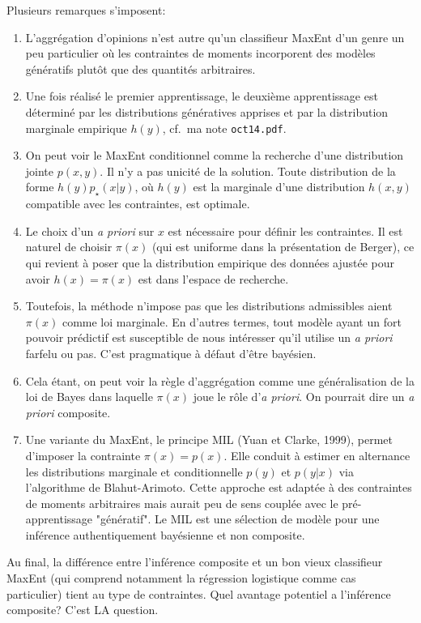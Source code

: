 \documentclass{article}
\begin{document}
Plusieurs remarques s'imposent:
\begin{enumerate}
    \item L'aggr\'egation d'opinions n'est autre qu'un classifieur MaxEnt d'un genre un peu particulier o\`u les contraintes de moments incorporent des mod\`eles g\'en\'eratifs plut\^ot que des quantit\'es arbitraires.
    \item  Une fois r\'ealis\'e le premier apprentissage, le deuxi\`eme apprentissage est d\'etermin\'e par les distributions g\'en\'eratives apprises et par la distribution marginale empirique $h(y)$, cf.~ma note {\tt oct14.pdf}.
    \item On peut voir le MaxEnt conditionnel comme la recherche d'une distribution jointe $p(x,y)$. Il n'y a pas unicit\'e de la solution. Toute distribution de la forme $h(y)p_\star(x|y)$, o\`u $h(y)$ est la marginale d'une distribution $h(x,y)$ compatible avec les contraintes, est optimale.
    \item Le choix d'un {\em a priori} sur $x$ est n\'ecessaire pour d\'efinir les contraintes. Il est naturel de choisir $\pi(x)$ (qui est uniforme dans la pr\'esentation de Berger), ce qui revient \`a poser que la distribution empirique des donn\'ees ajust\'ee pour avoir $h(x)=\pi(x)$ est dans l'espace de recherche.
    \item Toutefois, la m\'ethode n'impose pas que les distributions admissibles aient $\pi(x)$ comme loi marginale. En d'autres termes, tout mod\`ele ayant un fort pouvoir pr\'edictif est susceptible de nous int\'eresser qu'il utilise un {\em a priori} farfelu ou pas. C'est pragmatique \`a d\'efaut d'\^etre bay\'esien.
    \item Cela \'etant, on peut voir la r\`egle d'aggr\'egation comme une g\'en\'eralisation de la loi de Bayes dans laquelle $\pi(x)$ joue le r\^ole d'{\em a priori}. On pourrait dire un {\em a priori} composite.
    \item Une variante du MaxEnt, le principe MIL (Yuan et Clarke, 1999), permet d'imposer la contrainte $\pi(x)=p(x)$. Elle conduit \`a estimer en alternance les distributions marginale et conditionnelle $p(y)$ et $p(y|x)$ via l'algorithme de Blahut-Arimoto. Cette approche est adapt\'ee \`a des contraintes de moments arbitraires mais aurait peu de sens coupl\'ee avec le pr\'e-apprentissage "g\'en\'eratif". Le MIL est une s\'election de mod\`ele pour une inf\'erence authentiquement bay\'esienne et non composite.
\end{enumerate}

Au final, la diff\'erence entre l'inf\'erence composite et un bon vieux classifieur MaxEnt (qui comprend notamment la r\'egression logistique comme cas particulier) tient au type de contraintes. Quel avantage potentiel a l'inf\'erence composite? C'est LA question.
\end{document}
